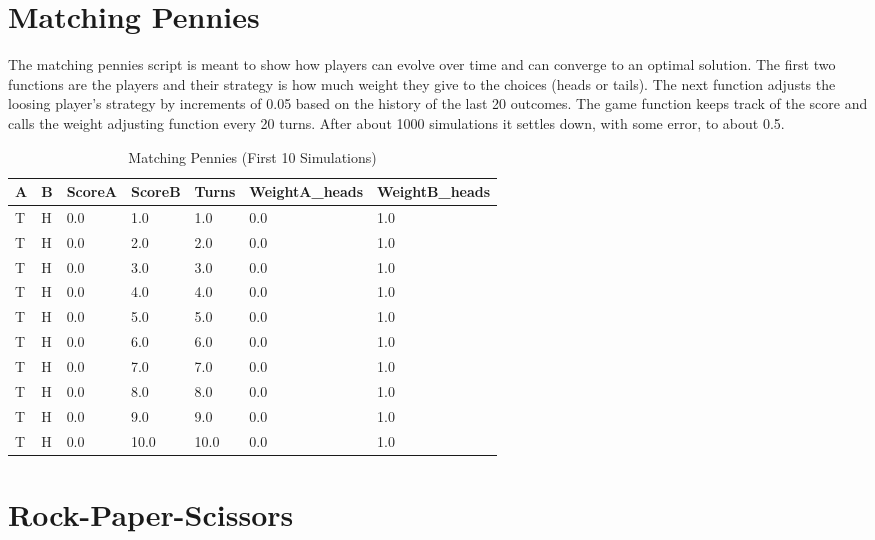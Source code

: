 
\section{Matching Pennies}



The matching pennies script is meant to show how players can evolve over time and can converge to an optimal solution. The first two functions are the players and their strategy is how much weight they give to the choices (heads or tails). The next function adjusts the loosing player's strategy by increments of 0.05 based on the history of the last 20 outcomes. The game function keeps track of the score and calls the weight adjusting function every 20 turns. After about 1000 simulations it settles down, with some error, to about 0.5.

\FloatBarrier
\begin{table}[]
\caption{Matching Pennies (First 10 Simulations)}
\begin{tabular}{lllllll}
\hline
A & B & ScoreA & ScoreB & Turns & WeightA\_heads & WeightB\_heads \\
\hline
T & H & 0.0    & 1.0    & 1.0   & 0.0            & 1.0            \\
T & H & 0.0    & 2.0    & 2.0   & 0.0            & 1.0            \\
T & H & 0.0    & 3.0    & 3.0   & 0.0            & 1.0            \\
T & H & 0.0    & 4.0    & 4.0   & 0.0            & 1.0            \\
T & H & 0.0    & 5.0    & 5.0   & 0.0            & 1.0            \\
T & H & 0.0    & 6.0    & 6.0   & 0.0            & 1.0            \\
T & H & 0.0    & 7.0    & 7.0   & 0.0            & 1.0            \\
T & H & 0.0    & 8.0    & 8.0   & 0.0            & 1.0            \\
T & H & 0.0    & 9.0    & 9.0   & 0.0            & 1.0            \\
T & H & 0.0    & 10.0   & 10.0  & 0.0            & 1.0           \\
\hline
\end{tabular}
\end{table}


\FloatBarrier
\section{Rock-Paper-Scissors}

